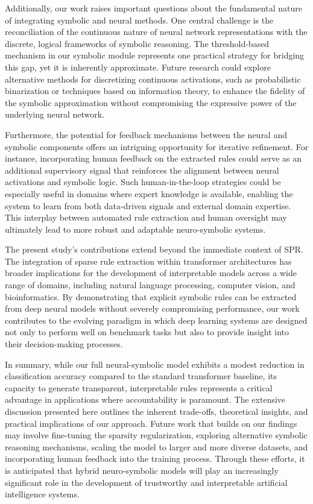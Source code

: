 \documentclass{article}
\begin{document}
Additionally, our work raises important questions about the fundamental nature of integrating symbolic and neural methods. One central challenge is the reconciliation of the continuous nature of neural network representations with the discrete, logical frameworks of symbolic reasoning. The threshold-based mechanism in our symbolic module represents one practical strategy for bridging this gap, yet it is inherently approximate. Future research could explore alternative methods for discretizing continuous activations, such as probabilistic binarization or techniques based on information theory, to enhance the fidelity of the symbolic approximation without compromising the expressive power of the underlying neural network.

Furthermore, the potential for feedback mechanisms between the neural and symbolic components offers an intriguing opportunity for iterative refinement. For instance, incorporating human feedback on the extracted rules could serve as an additional supervisory signal that reinforces the alignment between neural activations and symbolic logic. Such human-in-the-loop strategies could be especially useful in domains where expert knowledge is available, enabling the system to learn from both data-driven signals and external domain expertise. This interplay between automated rule extraction and human oversight may ultimately lead to more robust and adaptable neuro-symbolic systems.

The present study’s contributions extend beyond the immediate context of SPR. The integration of sparse rule extraction within transformer architectures has broader implications for the development of interpretable models across a wide range of domains, including natural language processing, computer vision, and bioinformatics. By demonstrating that explicit symbolic rules can be extracted from deep neural models without severely compromising performance, our work contributes to the evolving paradigm in which deep learning systems are designed not only to perform well on benchmark tasks but also to provide insight into their decision-making processes.

In summary, while our full neural-symbolic model exhibits a modest reduction in classification accuracy compared to the standard transformer baseline, its capacity to generate transparent, interpretable rules represents a critical advantage in applications where accountability is paramount. The extensive discussion presented here outlines the inherent trade-offs, theoretical insights, and practical implications of our approach. Future work that builds on our findings may involve fine-tuning the sparsity regularization, exploring alternative symbolic reasoning mechanisms, scaling the model to larger and more diverse datasets, and incorporating human feedback into the training process. Through these efforts, it is anticipated that hybrid neuro-symbolic models will play an increasingly significant role in the development of trustworthy and interpretable artificial intelligence systems.
\end{document}
